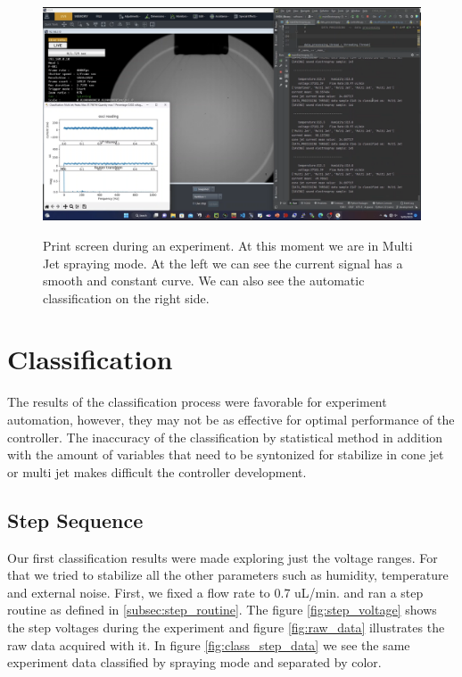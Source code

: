 \begin{figure}[H]
    \center
    {\includegraphics[width=17cm]{Figuras/19:03/axs2.png}}
    \caption{Print screen during an experiment. At this moment we are in Multi Jet spraying mode. At the left we can see the current signal has a smooth and constant curve. We can also see the automatic classification on the right side.}
    \label{fig:multi_class_exp}
\end{figure}


\section{Classification}
\label{sec:classification_results}

The results of the classification process were favorable for experiment automation, however, they may not be as effective for optimal performance of the controller.
The inaccuracy of the classification by statistical method in addition with the amount of variables that need to be syntonized for stabilize in cone jet or multi jet makes difficult the controller development.

\subsection{Step Sequence}
\label{subsec:step_results}

Our first classification results were made exploring just the voltage ranges. For that we tried to stabilize all the other parameters such as humidity, temperature and external noise.
First, we fixed a flow rate to 0.7 uL/min. and ran a step routine as defined in \ref{subsec:step_routine}. The figure \ref{fig:step_voltage} shows the step voltages during the experiment and figure \ref{fig:raw_data} illustrates the raw data acquired with it. In figure \ref{fig:class_step_data} we see the same experiment data classified by spraying mode and separated by color.


